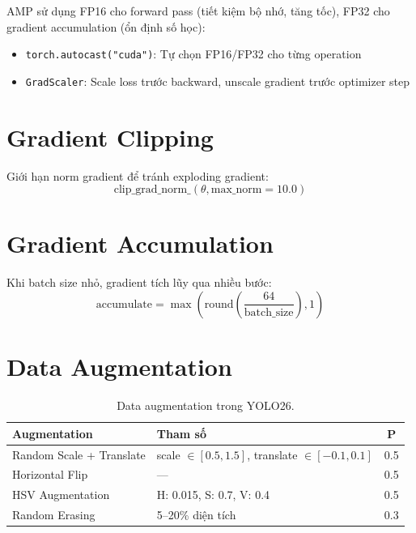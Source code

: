 AMP sử dụng FP16 cho forward pass (tiết kiệm bộ nhớ, tăng tốc), FP32 cho gradient accumulation (ổn định số học):
\begin{itemize}
    \item \texttt{torch.autocast("cuda")}: Tự chọn FP16/FP32 cho từng operation
    \item \texttt{GradScaler}: Scale loss trước backward, unscale gradient trước optimizer step
\end{itemize}

\section{Gradient Clipping}

Giới hạn norm gradient để tránh exploding gradient:
\begin{equation}
    \text{clip\_grad\_norm\_}(\theta, \text{max\_norm}=10.0)
\end{equation}

\section{Gradient Accumulation}

Khi batch size nhỏ, gradient tích lũy qua nhiều bước:
\begin{equation}
    \text{accumulate} = \max\left(\text{round}\left(\frac{64}{\text{batch\_size}}\right), 1\right)
\end{equation}

\section{Data Augmentation}

\begin{table}[H]
\centering
\begin{tabular}{llc}
\toprule
\textbf{Augmentation} & \textbf{Tham số} & \textbf{P} \\
\midrule
Random Scale + Translate & scale $\in [0.5, 1.5]$, translate $\in [-0.1, 0.1]$ & 0.5 \\
Horizontal Flip & --- & 0.5 \\
HSV Augmentation & H: 0.015, S: 0.7, V: 0.4 & 0.5 \\
Random Erasing & 5--20\% diện tích & 0.3 \\
\bottomrule
\end{tabular}
\caption{Data augmentation trong YOLO26.}
\end{table}

